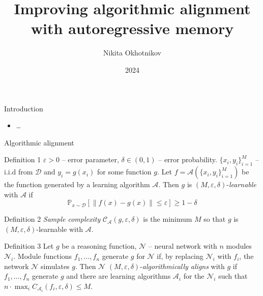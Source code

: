 \documentclass[10pt]{beamer}
\title[]{Improving algorithmic alignment with autoregressive memory}
\author{Nikita Okhotnikov}
\date{2024}
\begin{document}
\begin{frame}
  \titlepage

\end{frame}

\begin{frame}{Introduction}
	\begin{itemize}
		\item \dots
	\end{itemize}
\end{frame}

\begin{frame}{Algorithmic alignment}
	\begin{block}{Definition 1}
		$\varepsilon >0 $ -- error parameter, $\delta\in (0,1)$ -- error probability. 
		$\{x_i, y_i\}_{i=1}^M$ -- i.i.d from $\mathcal{D}$ and $y_i = g(x_i)$ for some function $g$. Let
		$f = \mathcal{A}(\{x_i, y_i\}_{i=1}^M)$ be the function generated by a learning algorithm $\mathcal{A}$.
		Then $g$ is $(M, \varepsilon, \delta)$-\textit{learnable} with $\mathcal{A}$ if 
		$$\mathbb{P}_{x\sim \mathcal{D}}\left[\|f(x)-g(x)\|\leq \varepsilon\right] \geq 1-\delta$$ 
	\end{block}
	\begin{block}{Definition 2}
		\textit{Sample complexity} $\mathcal{C}_\mathcal{A}(g, \varepsilon, \delta)$ is the minimum $M$ so that $g$
		is $(M, \varepsilon, \delta)$-learnable with $\mathcal{A}$.
	\end{block}
	\begin{block}{Definition 3}
		Let $g$ be a reasoning function, $\mathcal{N}$ -- neural network with $n$ modules $\mathcal{N}_i$. 
		Module functions $f_1, \dots, f_n$ generate $g$ for $\mathcal{N}$ if, by replacing $\mathcal{N}_i$ with $f_i$, the network $\mathcal{N}$ simulates $g$. 
		Then $\mathcal{N}$ $(M, \varepsilon, \delta)$-\textit{algorithmically aligns} with $g$ if $f_1, \dots, f_n$ generate $g$ and 
		there are learning algorithms $\mathcal{A}_i$ for the $\mathcal{N}_i$ such that $n\cdot\max_i C_{\mathcal{A}_i}(f_i, \varepsilon, \delta)\leq M$.	
	\end{block}
\end{frame}
\end{document}
